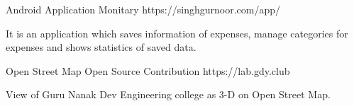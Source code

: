 \begin{cventries}

\cventry
{Android Application}%
{Monitary} 
{https://singhgurnoor.com/app/ } %
{ } %
{ \begin{cvitems}
\item {It is an application which saves information of expenses, manage categories for expenses and shows statistics of saved data.}\end{cvitems}
}

\cventry
{Open Street Map} %
{Open Source Contribution} %
{https://lab.gdy.club} %
{ } %
{ \begin{cvitems}
\item {View of Guru Nanak Dev Engineering college as $3$-D on Open Street Map.}\end{cvitems}
}
 
 
\end{cventries}